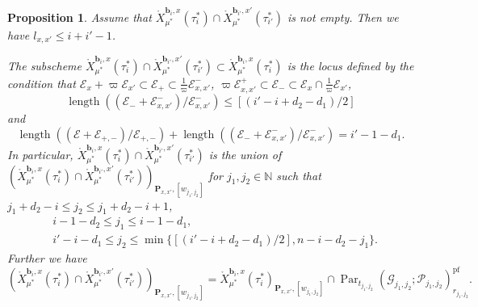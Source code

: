 \documentclass[12pt,a4paper]{article}
\newtheorem{prop}[thm]{Proposition}
\DeclareMathOperator{\length}{length}
\DeclareMathOperator{\Par}{Par}
\newcommand{\bN}{\mathbb{N}}
\newcommand{\bfP}{\mathbf{P}}
\newcommand{\bfb}{\mathbf{b}}
\newcommand{\cE}{\mathcal{E}}
\newcommand{\sG}{\mathscr{G}}
\newcommand{\sP}{\mathscr{P}}
\newcommand{\pf}{\mathrm{pf}}
\begin{document}
\begin{prop}\label{prop:inter}
Assume that 
$\mathring{X}_{\mu^*}^{\bfb_i,x}(\tau_i^*) \cap \mathring{X}_{\mu^*}^{\bfb_{i'},x'}(\tau_{i'}^*)$ 
is not empty. 
Then we have $l_{x,x'} \leq i+i'-1$. 

The subscheme 
$\mathring{X}_{\mu^*}^{\bfb_i,x}(\tau_i^*) \cap \mathring{X}_{\mu^*}^{\bfb_{i'},x'}(\tau_{i'}^*) \subset \mathring{X}_{\mu^*}^{\bfb_{i},x}(\tau_{i}^*)$ is the locus defined by the condition that 
$\cE_x +\varpi \cE_{x'} \subset \cE_+ \subset \frac{1}{\varpi} \cE_{x,x'}^-$, 
$\varpi \cE_{x,x'}^+ \subset \cE_- \subset \cE_x \cap \frac{1}{\varpi} \cE_{x'}$, 
\begin{equation}\label{eq:lengE-}
 \length ((\cE_- +\cE_{x,x'}^-)/ \cE_{x,x'}^- ) \leq  [(i'-i+d_2 -d_1 )/2] 
\end{equation} 
and 
\begin{equation}\label{eq:lengsum}
 \length ((\cE +\cE_{+,-} )/ \cE_{+,-}) + \length ((\cE_- +\cE_{x,x'}^-)/ \cE_{x,x'}^- ) = i'-1 -d_1. 
\end{equation} 
In particular,  
$\mathring{X}_{\mu^*}^{\bfb_i,x}(\tau_i^*) \cap \mathring{X}_{\mu^*}^{\bfb_{i'},x'}(\tau_{i'}^*)$ 
is the union of 
$\left( \mathring{X}_{\mu^*}^{\bfb_i,x}(\tau_i^*) \cap \mathring{X}_{\mu^*}^{\bfb_{i'},x'}(\tau_{i'}^*) \right)_{\bfP_{x,x'},[w_{j_1,j_2}]}$ 
for 
$j_1,j_2 \in \bN$ such that $j_1 +d_2 -i \leq j_2 \leq j_1 +d_2-i +1$, 
\begin{align*}
    &i-1-d_2 \leq j_1 \leq i-1-d_1
    ,\\  
 &
 i' -i -d_1 \leq 
 j_2 \leq \min \{ 
 [(i'-i+d_2 -d_1 )/2] 
 , n-i-d_2 -j_1 
 \}. 
\end{align*}
Further we have 
\[
 \left( \mathring{X}_{\mu^*}^{\bfb_i,x}(\tau_i^*) \cap \mathring{X}_{\mu^*}^{\bfb_{i'},x'}(\tau_{i'}^*)  \right)_{\bfP_{x,x'},[w_{j_1,j_2}]} = 
 \mathring{X}_{\mu^*}^{\bfb_i,x}(\tau_i^*)_{\bfP_{x,x'},[w_{j_1,j_2}]} 
 \cap \Par_{t_{j_1,j_2}} 
(\sG_{j_1,j_2}; \sP_{j_1,j_2})_{r_{j_1,j_2}}^{\pf} . 
\] 
\end{prop}
\end{document}
